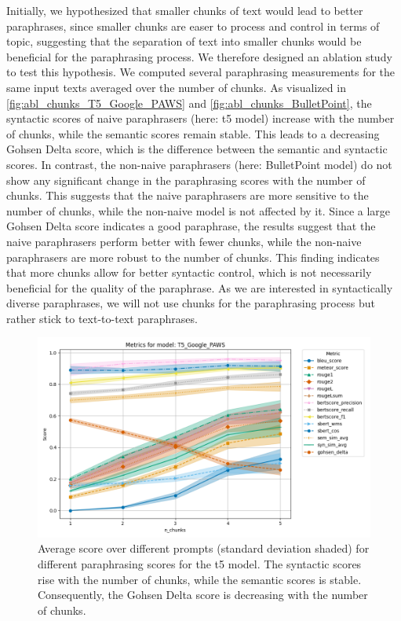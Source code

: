 Initially, we hypothesized that smaller chunks of text would lead to better paraphrases, 
since smaller chunks are easer to process and control in terms of topic,
suggesting that the separation of text into smaller chunks would be beneficial for the paraphrasing process.
We therefore designed an ablation study to test this hypothesis.
We computed several paraphrasing measurements for the same input texts averaged over the number of chunks.
As visualized in \autoref{fig:abl_chunks_T5_Google_PAWS} and \autoref{fig:abl_chunks_BulletPoint},
the syntactic scores of naive paraphrasers (here: \ac{t5} model) increase with the number of chunks,
while the semantic scores remain stable.
This leads to a decreasing Gohsen Delta score, which is the difference between the semantic and syntactic scores.
In contrast, the non-naive paraphrasers (here: BulletPoint model) do not show any significant change in the paraphrasing scores with the number of chunks.
This suggests that the naive paraphrasers are more sensitive to the number of chunks, 
while the non-naive model is not affected by it.
Since a large Gohsen Delta score indicates a good paraphrase,
the results suggest that the naive paraphrasers perform better with fewer chunks, 
while the non-naive paraphrasers are more robust to the number of chunks.
This finding indicates that more chunks allow for better syntactic control, which is not necessarily beneficial for the quality of the paraphrase.
As we are interested in syntactically diverse paraphrases,
we will not use chunks for the paraphrasing process but rather stick to text-to-text paraphrases.
 
\begin{figure}[htbp]
    \centering
    \includegraphics[width=\textwidth]{images/paraphrasing/experiments/T5_Google_PAWS_metrics_plot.png}
    \caption{Average score over different prompts (standard deviation shaded) for different paraphrasing scores for the \ac{t5} model.
    The syntactic scores rise with the number of chunks, while the semantic scores is stable.
    Consequently, the Gohsen Delta score is decreasing with the number of chunks.}
    \label{fig:abl_chunks_T5_Google_PAWS}
\end{figure}

